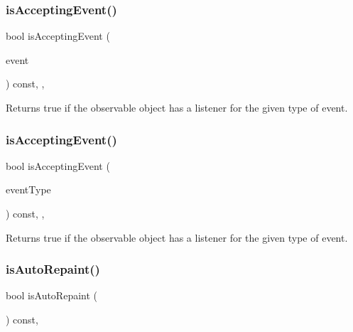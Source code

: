 \subsubsection{\texorpdfstring{is\+Accepting\+Event()}{isAcceptingEvent()}\hspace{0.1cm}{\footnotesize\ttfamily [2/3]}}
{\footnotesize\ttfamily bool is\+Accepting\+Event (\begin{DoxyParamCaption}\item[{const \mbox{\hyperlink{classGEvent}{G\+Event}} \&}]{event }\end{DoxyParamCaption}) const\hspace{0.3cm}{\ttfamily [protected]}, {\ttfamily [virtual]}, {\ttfamily [inherited]}}



Returns true if the observable object has a listener for the given type of event. 

\mbox{\label{classGObservable_a3b1c689267eda44e65a2213e7de38b23}} 
\subsubsection{\texorpdfstring{is\+Accepting\+Event()}{isAcceptingEvent()}\hspace{0.1cm}{\footnotesize\ttfamily [3/3]}}
{\footnotesize\ttfamily bool is\+Accepting\+Event (\begin{DoxyParamCaption}\item[{const std\+::string \&}]{event\+Type }\end{DoxyParamCaption}) const\hspace{0.3cm}{\ttfamily [protected]}, {\ttfamily [virtual]}, {\ttfamily [inherited]}}



Returns true if the observable object has a listener for the given type of event. 

\mbox{\label{classGCanvas_a189881032e2b355095790b83b2454d8d}} 
\subsubsection{\texorpdfstring{is\+Auto\+Repaint()}{isAutoRepaint()}}
{\footnotesize\ttfamily bool is\+Auto\+Repaint (\begin{DoxyParamCaption}{ }\end{DoxyParamCaption}) const\hspace{0.3cm}{\ttfamily [override]}, {\ttfamily [virtual]}}



